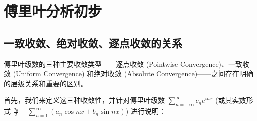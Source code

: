 \section{傅里叶分析初步}

\subsection{一致收敛、绝对收敛、逐点收敛的关系}

傅里叶级数的三种主要收敛类型——逐点收敛 (Pointwise Convergence)、一致收敛 (Uniform Convergence) 和绝对收敛 (Absolute Convergence)——之间存在明确的层级关系和重要的区别。

首先，我们来定义这三种收敛性，并针对傅里叶级数 $\sum_{n=-\infty}^{\infty} c_n e^{inx}$ (或其实数形式 $\frac{a_0}{2} + \sum_{n=1}^{\infty} (a_n \cos nx + b_n \sin nx)$) 进行说明：

